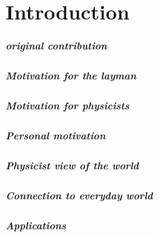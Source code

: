 \chapter{Introduction}

\paragraph{original contribution}

\paragraph{Motivation for the layman}
\paragraph{Motivation for physicists}
\paragraph{Personal motivation}


\paragraph{Physicist view of the world}

\paragraph{Connection to everyday world}

\paragraph{Applications}


